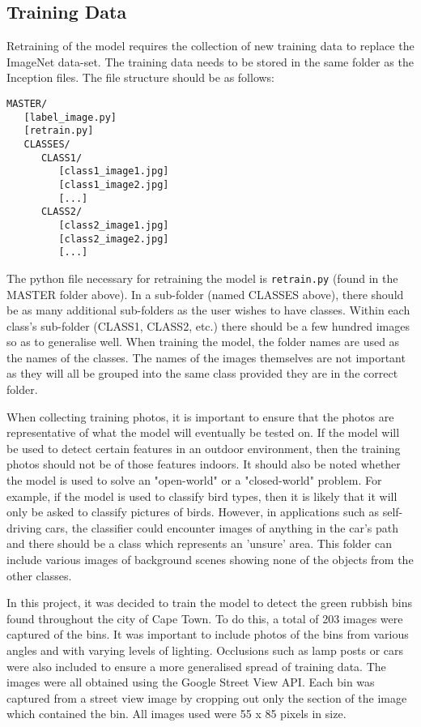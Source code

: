 \subsection{Training Data}
Retraining of the model requires the collection of new training data to replace the ImageNet data-set. The training data needs to be stored in the same folder as the Inception files. The file structure should be as follows:

\begin{verbatim}
MASTER/
   [label_image.py]
   [retrain.py]
   CLASSES/
      CLASS1/
         [class1_image1.jpg]
         [class1_image2.jpg]
         [...]
      CLASS2/
         [class2_image1.jpg]
         [class2_image2.jpg]
         [...]
\end{verbatim}

The python file necessary for retraining the model is \verb|retrain.py| (found in the MASTER folder above). In a sub-folder (named CLASSES above), there should be as many additional sub-folders as the user wishes to have classes. Within each class's sub-folder (CLASS1, CLASS2, etc.) there should be a few hundred images so as to generalise well. When training the model, the folder names are used as the names of the classes. The names of the images themselves are not important as they will all be grouped into the same class provided they are in the correct folder.

When collecting training photos, it is important to ensure that the photos are representative of what the model will eventually be tested on. If the model will be used to detect certain features in an outdoor environment, then the training photos should not be of those features indoors. It should also be noted whether the model is used to solve an "open-world" or a "closed-world" problem. For example, if the model is used to classify bird types, then it is likely that it will only be asked to classify pictures of birds. However, in applications such as self-driving cars, the classifier could encounter images of anything in the car's path and there should be a class which represents an 'unsure' area. This folder can include various images of background scenes showing none of the objects from the other classes.

In this project, it was decided to train the model to detect the green rubbish bins found throughout the city of Cape Town. To do this, a total of 203 images were captured of the bins. It was important to include photos of the bins from various angles and with varying levels of lighting. Occlusions such as lamp posts or cars were also included to ensure a more generalised spread of training data. The images were all obtained using the Google Street View API. Each bin was captured from a street view image by cropping out only the section of the image which contained the bin. All images used were 55 x 85 pixels in size.

